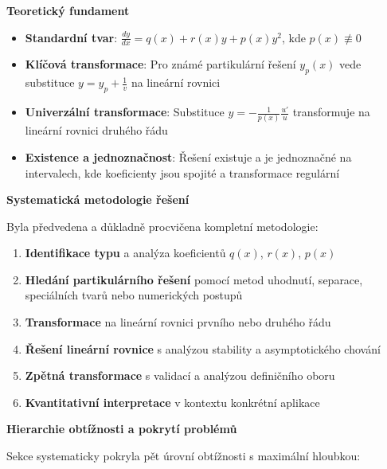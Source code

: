 \vspace{1\baselineskip}

\noindent\textbf{Teoretický fundament}

\begin{itemize}
\item \textbf{Standardní tvar}: $\frac{dy}{dx} = q(x) + r(x)y + p(x)y^2$, kde $p(x) \not\equiv 0$
\item \textbf{Klíčová transformace}: Pro známé partikulární řešení $y_p(x)$ vede substituce $y = y_p + \frac{1}{v}$ na lineární rovnici
\item \textbf{Univerzální transformace}: Substituce $y = -\frac{1}{p(x)}\frac{u'}{u}$ transformuje na lineární rovnici druhého řádu
\item \textbf{Existence a jednoznačnost}: Řešení existuje a je jednoznačné na intervalech, kde koeficienty jsou spojité a transformace regulární
\end{itemize}

\vspace{1\baselineskip}

\noindent\textbf{Systematická metodologie řešení}

Byla předvedena a důkladně procvičena kompletní metodologie:
\begin{enumerate}
\item \textbf{Identifikace typu} a analýza koeficientů $q(x)$, $r(x)$, $p(x)$
\item \textbf{Hledání partikulárního řešení} pomocí metod uhodnutí, separace, speciálních tvarů nebo numerických postupů
\item \textbf{Transformace} na lineární rovnici prvního nebo druhého řádu
\item \textbf{Řešení lineární rovnice} s analýzou stability a asymptotického chování
\item \textbf{Zpětná transformace} s validací a analýzou definičního oboru
\item \textbf{Kvantitativní interpretace} v kontextu konkrétní aplikace
\end{enumerate}

\vspace{1\baselineskip}

\noindent\textbf{Hierarchie obtížnosti a pokrytí problémů}

Sekce systematicky pokryla pět úrovní obtížnosti s maximální hloubkou:

